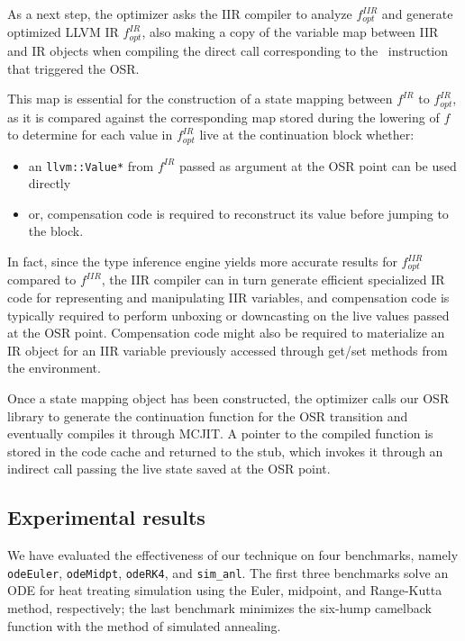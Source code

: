 As a next step, the optimizer asks the IIR compiler to analyze $f^{IIR}_{opt}$ and generate optimized LLVM IR $f^{IR}_{opt}$, also making a copy of the variable map between IIR and IR objects when compiling the direct call corresponding to the \feval\ instruction that triggered the OSR.

This map is essential for the construction of a state mapping between $f^{IR}$ to $f^{IR}_{opt}$, as it is compared against the corresponding map stored during the lowering of $f$ to determine for each value in $f^{IR}_{opt}$ live at the continuation block whether:
\begin{itemize}
\item an {\tt llvm::Value*} from $f^{IR}$ passed as argument at the OSR point can be used directly
\item or, compensation code is required to reconstruct its value before jumping to the block.
\end{itemize}

In fact, since the type inference engine yields more accurate results for $f^{IIR}_{opt}$ compared to $f^{IIR}$, the IIR compiler can in turn generate efficient specialized IR code for representing and manipulating IIR variables, and compensation code is typically required to perform unboxing or downcasting on the live values passed at the OSR point. Compensation code might also be required to materialize an IR object for an IIR variable previously accessed through get/set methods from the environment.

Once a state mapping object has been constructed, the optimizer calls our OSR library to generate the continuation function for the OSR transition and eventually compiles it through MCJIT. A pointer to the compiled function is stored in the code cache and returned to the stub, which invokes it through an indirect call passing the live state saved at the OSR point.

\subsection{Experimental results}
We have evaluated the effectiveness of our technique on four benchmarks, namely {\tt odeEuler}, {\tt odeMidpt}, {\tt odeRK4}, and {\tt sim\_anl}. The first three benchmarks solve an ODE for heat treating simulation using the Euler, midpoint, and Range-Kutta method, respectively; the last benchmark minimizes the six-hump camelback function with the method of simulated annealing.
  
